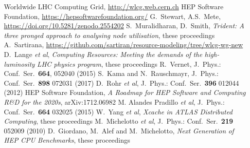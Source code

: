 \begin{thebibliography}{}
Worldwide LHC Computing Grid, \url{http://wlcg.web.cern.ch}
HEP Software Foundation, \url{https://hepsoftwarefoundation.org/}
G.~Stewart, A.S.~Mete, \url{https://doi.org/10.5281/zenodo.2554202}
S.~Muralidharan, D.~Smith, \textit{Trident: A three pronged approach to analysing node utilisation}, these proceedings
A.~Sartirana, \url{https://github.com/sartiran/resource-modeling/tree/wlcg-wg-new}
D.~Lange {\em et al}, \textit{Computing Resources: Meeting the demands of the high-luminosity LHC physics program}, these proceedings
R.~Vernet, J.\ Phys.: Conf.\ Ser.\ \textbf{664}, 052040 (2015)
S.~Kama and N.~Rauschmayr, J.\ Phys.: Conf.\ Ser.\ {\bf 898} 072031 (2017)
D.~Rohr {\em et al}, J.\ Phys.: Conf.\ Ser.\ \textbf{396} 012044 (2012)
HEP Software Foundation, \textit{A Roadmap for HEP Software and Computing R\&D for the 2020s}, arXiv:1712.06982
M. Alandes Pradillo {\em et al}, J.\ Phys.: Conf.\ Ser.\ \textbf{664} 032025 (2015)
W.~Yang {\em et al}, \textit{Xcache in ATLAS Distributed Computing}, these proceedings
M.~Michelotto {\em et al}, J.\ Phys.: Conf.\ Ser.\ \textbf{219} 052009 (2010)
D.~Giordano, M.~Alef and M.~Michelotto, \textit{Next Generation of HEP CPU Benchmarks}, these proceedings
\end{thebibliography}
